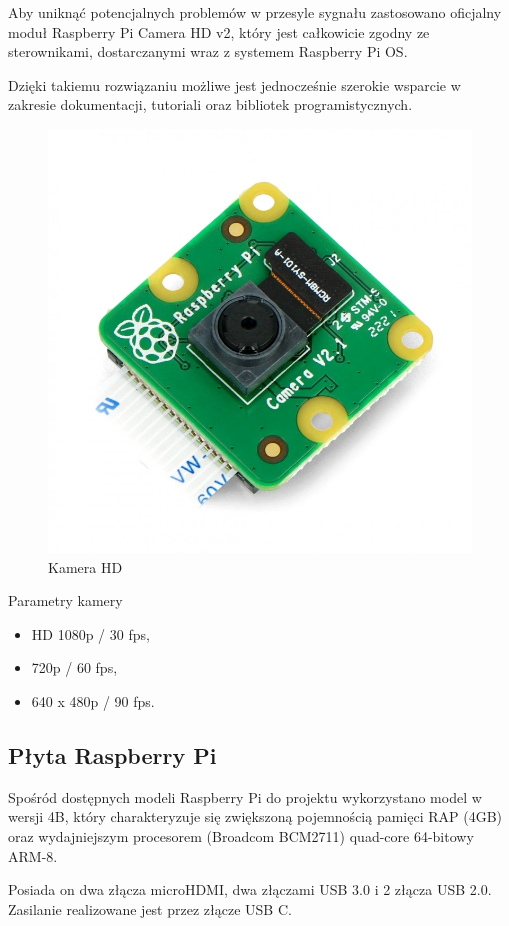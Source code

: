 \documentclass[a4paper,12pt,reqno]{article}
\begin{document}
Aby uniknąć potencjalnych problemów w przesyle sygnału zastosowano oficjalny moduł Raspberry Pi Camera HD v2, który jest całkowicie zgodny ze sterownikami, dostarczanymi wraz z systemem Raspberry Pi OS.

Dzięki takiemu rozwiązaniu możliwe jest jednocześnie szerokie wsparcie w zakresie dokumentacji, tutoriali oraz bibliotek programistycznych.

\begin{figure}[H]%
\centering
\includegraphics[width=0.8\columnwidth]{imgs/camera.png}
\caption{Kamera HD \cite{img_cam} \label{kamera}}
\quad
\end{figure}

Parametry kamery

\begin{itemize}
	\item HD 1080p / 30 fps,
	\item 720p / 60 fps,
	\item 640 x 480p / 90 fps.
\end{itemize}

\subsection{Płyta Raspberry Pi}

Spośród dostępnych modeli Raspberry Pi do projektu wykorzystano model w wersji 4B, który charakteryzuje się zwiększoną pojemnością pamięci RAP (4GB) oraz wydajniejszym procesorem (Broadcom BCM2711) quad-core 64-bitowy ARM-8.

Posiada on dwa złącza microHDMI, dwa złączami USB 3.0 i 2 złącza USB 2.0. Zasilanie realizowane jest przez złącze USB C.
\end{document}
